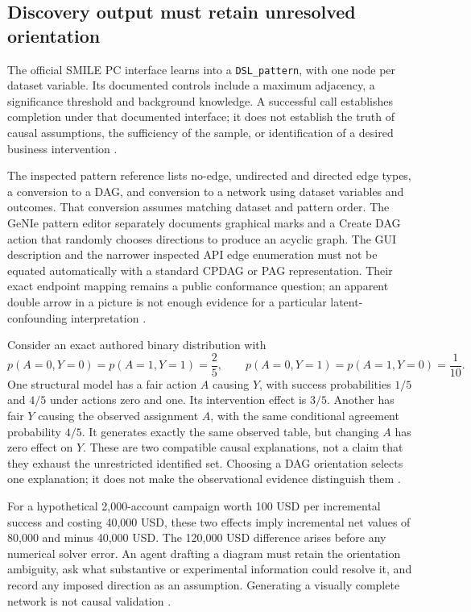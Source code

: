 \subsection{Discovery output must retain unresolved orientation}
The official SMILE PC interface learns into a \texttt{DSL\_pattern}, with
one node per dataset variable. Its documented controls include a maximum
adjacency, a significance threshold and background knowledge. A successful
call establishes completion under that documented interface; it does not
establish the truth of causal assumptions, the sufficiency of the sample,
or identification of a desired business intervention
\citep{exec13_smile_pc,exec24_smile_choice}.

The inspected pattern reference lists no-edge, undirected and directed edge
types, a conversion to a DAG, and conversion to a network using dataset
variables and outcomes. That conversion assumes matching dataset and
pattern order. The GeNIe pattern editor separately documents graphical
marks and a Create DAG action that randomly chooses directions to produce
an acyclic graph. The GUI description and the narrower inspected API edge
enumeration must not be equated automatically with a standard CPDAG or PAG
representation. Their exact endpoint mapping remains a public conformance
question; an apparent double arrow in a picture is not enough evidence
for a particular latent-confounding interpretation
\citep{exec13_smile_pattern,exec13_genie_pattern,exec24_smile_choice}.

Consider an exact authored binary distribution with
\[
 p(A=0,Y=0)=p(A=1,Y=1)=\frac25,\qquad
 p(A=0,Y=1)=p(A=1,Y=0)=\frac1{10}.
\]
One structural model has a fair action $A$ causing $Y$, with success
probabilities $1/5$ and $4/5$ under actions zero and one. Its intervention
effect is $3/5$. Another has fair $Y$ causing the observed assignment $A$,
with the same conditional agreement probability $4/5$. It generates exactly
the same observed table, but changing $A$ has zero effect on $Y$.
These are two compatible causal explanations, not a claim that they exhaust
the unrestricted identified set. Choosing a DAG orientation selects one
explanation; it does not make the observational evidence distinguish them
\citep{exec24_smile_choice}.

For a hypothetical 2,000-account campaign worth 100 USD per incremental
success and costing 40,000 USD, these two effects imply incremental net
values of 80,000 and minus 40,000 USD. The 120,000 USD difference arises
before any numerical solver error. An agent drafting a diagram must retain
the orientation ambiguity, ask what substantive or experimental information
could resolve it, and record any imposed direction as an assumption.
Generating a visually complete network is not causal validation
\citep{exec24_smile_choice}.

